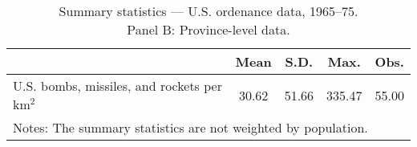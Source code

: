 \begin{table}[htbp]\centering
\def\sym#1{\ifmmode^{#1}\else\(^{#1}\)\fi}
\caption{Summary statistics — U.S. ordenance data, 1965–75. \\ Panel B: Province-level data.}
\begin{tabular}{l*{1}{cccc}}
\toprule
                    &        Mean&        S.D.&        Max.&        Obs.\\
\midrule
U.S. bombs, missiles, and rockets per km$^2$&       30.62&       51.66&      335.47&       55.00\\
\bottomrule
\multicolumn{5}{l}{\footnotesize Notes: The summary statistics are not weighted by population.}\\
\end{tabular}
\end{table}
